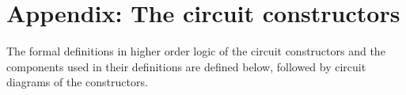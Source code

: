 \documentclass{llncs}
\begin{document}
\newpage
\section*{Appendix: The circuit constructors}
\label{CircuitConstructors}
\vspace*{-3mm}

The formal definitions in higher order logic of the circuit
constructors and the components used in their definitions are defined
below, followed by circuit diagrams of the constructors.
\end{document}

